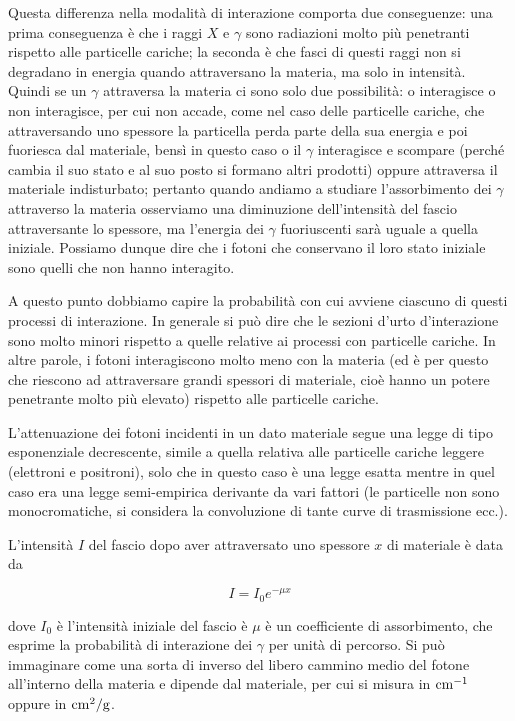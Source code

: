 Questa differenza nella modalità di interazione comporta due conseguenze: una prima conseguenza è che i raggi $X$ e $\gamma$ sono radiazioni molto più penetranti rispetto alle particelle cariche; la seconda è che fasci di questi raggi non si degradano in energia quando attraversano la materia, ma solo in intensità. Quindi se un $\gamma$ attraversa la materia ci sono solo due possibilità: o interagisce o non interagisce, per cui non accade, come nel caso delle particelle cariche, che attraversando uno spessore la particella perda parte della sua energia e poi fuoriesca dal materiale, bensì in questo caso o il $\gamma$ interagisce e scompare (perché cambia il suo stato e al suo posto si formano altri prodotti) oppure attraversa il materiale indisturbato; pertanto quando andiamo a studiare l'assorbimento dei $\gamma$ attraverso la materia osserviamo una diminuzione dell'intensità del fascio attraversante lo spessore, ma l'energia dei $\gamma$ fuoriuscenti sarà uguale a quella iniziale. Possiamo dunque dire che i fotoni che conservano il loro stato iniziale sono quelli che non hanno interagito.

A questo punto dobbiamo capire la probabilità con cui avviene ciascuno di questi processi di interazione. In generale si può dire che le sezioni d'urto d'interazione sono molto minori rispetto a quelle relative ai processi con particelle cariche. In altre parole, i fotoni interagiscono molto meno con la materia (ed è per questo che riescono ad attraversare grandi spessori di materiale, cioè hanno un potere penetrante molto più elevato) rispetto alle particelle cariche.

L'attenuazione dei fotoni incidenti in un dato materiale segue una legge di tipo esponenziale decrescente, simile a quella relativa alle particelle cariche leggere (elettroni e positroni), solo che in questo caso è una legge esatta mentre in quel caso era una legge semi-empirica derivante da vari fattori (le particelle non sono monocromatiche, si considera la convoluzione di tante curve di trasmissione ecc.).

L'intensità $I$ del fascio dopo aver attraversato uno spessore $x$ di materiale è data da

\begin{equation*}
    I=I_0 e^{-\mu x}
\end{equation*}

dove $I_0$ è l'intensità iniziale del fascio è $\mu$ è un coefficiente di assorbimento, che esprime la probabilità di interazione dei $\gamma$ per unità di percorso. Si può immaginare come una sorta di inverso del libero cammino medio del fotone all'interno della materia e dipende dal materiale, per cui si misura in $\rm cm^{-1}$ oppure in $\rm cm^2/g$.

